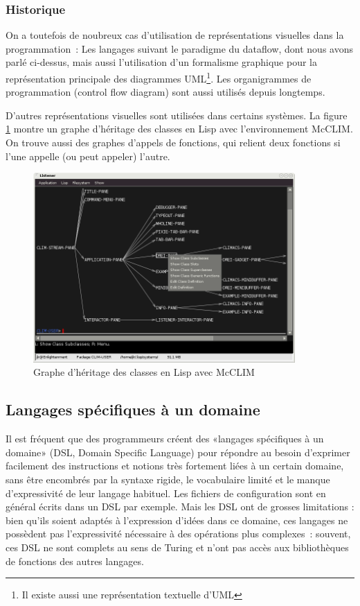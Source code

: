 \documentclass{article}
\begin{document}
\subsubsection{Historique}
On a toutefois de noubreux cas d'utilisation de représentations visuelles dans la programmation~: Les langages suivant le paradigme du
dataflow, dont nous avons parlé ci-dessus, mais aussi l'utilisation d'un formalisme graphique pour la représentation principale des
diagrammes UML\footnote{Il existe aussi une représentation textuelle d'UML\cite{htun-spec}}. Les organigrammes de programmation (control
flow diagram) sont aussi utilisés depuis longtemps.

D'autres représentations visuelles sont utilisées dans certains systèmes. La figure \ref{fig:lisp-class-graph} montre un graphe d'héritage
des classes en Lisp avec l'environnement McCLIM. On trouve aussi des graphes d'appels de fonctions, qui relient deux fonctions si l'une
appelle (ou peut appeler) l'autre.

\begin{figure}[h!]
  \centering
  \includegraphics[width=10cm]{lisp-class-graph}
  \caption{Graphe d'héritage des classes en Lisp avec McCLIM}
\label{fig:lisp-class-graph}
\end{figure}

\subsection{Langages spécifiques à un domaine}
\label{sec:dsl}

Il est fréquent que des programmeurs créent des «langages spécifiques à un domaine» (DSL, Domain Specific Language) pour répondre au besoin
d'exprimer facilement des instructions et notions très fortement liées à un certain domaine, sans être encombrés par la syntaxe rigide, le
vocabulaire limité et le manque d'expressivité de leur langage habituel. Les fichiers de configuration sont en général écrits dans un DSL
par exemple. Mais les DSL ont de grosses limitations : bien qu'ils soient adaptés à l'expression d'idées dans ce domaine, ces langages ne
possèdent pas l'expressivité nécessaire à des opérations plus complexes~: souvent, ces DSL ne sont complets au sens de Turing et n'ont pas
accès aux bibliothèques de fonctions des autres langages.
\end{document}
